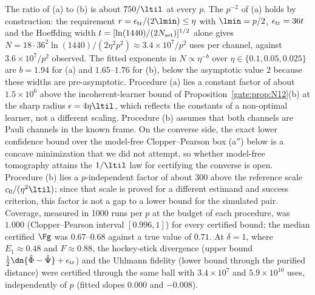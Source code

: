 The ratio of (a) to (b) is about $750/\ltil$ at every $p$. The $p^{-2}$ of (a) holds by construction: the requirement $r=\epsilon_{\rm tr}/(2\lmin)\le\eta$ with $\lmin=p/2$, $\epsilon_{\rm tr}=36t$ and the Hoeffding width $t=[\ln(1440)/(2N_{\rm set})]^{1/2}$ alone gives $N=18\cdot36^2\ln(1440)/(2\eta^2p^2)\approx3.4\times10^7/p^2$ uses per channel, against $3.6\times10^7/p^2$ observed. The fitted exponents in $N\propto\eta^{-b}$ over $\eta\in\{0.1,0.05,0.025\}$ are $b=1.94$ for (a) and $1.65$--$1.76$ for (b), below the asymptotic value $2$ because these widths are pre-asymptotic. Procedure (a) lies a constant factor of about $1.5\times10^6$ above the incoherent-learner bound of Proposition~\ref{gate:prop:N12}(b) at the sharp radius $\epsilon=4\eta\ltil$, which reflects the constants of a non-optimal learner, not a different scaling. Procedure (b) assumes that both channels are Pauli channels in the known frame. On the converse side, the exact lower confidence bound over the model-free Clopper--Pearson box (a$''$) below is a concave minimization that we did not attempt, so whether model-free tomography attains the $1/\ltil$ law for certifying the converse is open. Procedure (b) lies a $p$-independent factor of about $300$ above the reference scale $c_0/(\eta^2\ltil)$; since that scale is proved for a different estimand and success criterion, this factor is not a gap to a lower bound for the simulated pair. Coverage, measured in 1000 runs per $p$ at the budget of each procedure, was $1.000$ (Clopper--Pearson interval $[0.996,1]$) for every certified bound; the median certified $\Fg$ was $0.67$--$0.68$ against a true value of $0.71$. At $\delta=1$, where $E_1\approx0.48$ and $F\approx0.88$, the hockey-stick divergence (upper bound $\frac12\dn{\hat\Phi-\hat\Psi}+\epsilon_{\rm tr}$) and the Uhlmann fidelity (lower bound through the purified distance) were certified through the same ball with $3.4\times10^{7}$ and $5.9\times10^{10}$ uses, independently of $p$ (fitted slopes $0.000$ and $-0.008$).


